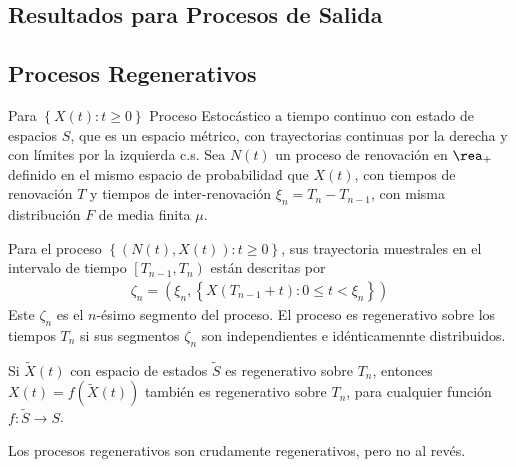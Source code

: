 \subsection{Resultados para Procesos de Salida}




\subsection{Procesos Regenerativos}

Para $\left\{X\left(t\right):t\geq0\right\}$ Proceso Estoc\'astico a tiempo continuo con estado de espacios $S$, que es un espacio m\'etrico, con trayectorias continuas por la derecha y con l\'imites por la izquierda c.s. Sea $N\left(t\right)$ un proceso de renovaci\'on en $\rea_{+}$ definido en el mismo espacio de probabilidad que $X\left(t\right)$, con tiempos de renovaci\'on $T$ y tiempos de inter-renovaci\'on $\xi_{n}=T_{n}-T_{n-1}$, con misma distribuci\'on $F$ de media finita $\mu$.



\begin{Def}
Para el proceso $\left\{\left(N\left(t\right),X\left(t\right)\right):t\geq0\right\}$, sus trayectoria muestrales en el intervalo de tiempo $\left[T_{n-1},T_{n}\right)$ est\'an descritas por
\begin{eqnarray*}
\zeta_{n}=\left(\xi_{n},\left\{X\left(T_{n-1}+t\right):0\leq t<\xi_{n}\right\}\right)
\end{eqnarray*}
Este $\zeta_{n}$ es el $n$-\'esimo segmento del proceso. El proceso es regenerativo sobre los tiempos $T_{n}$ si sus segmentos $\zeta_{n}$ son independientes e id\'enticamennte distribuidos.
\end{Def}


\begin{Obs}
Si $\tilde{X}\left(t\right)$ con espacio de estados $\tilde{S}$ es regenerativo sobre $T_{n}$, entonces $X\left(t\right)=f\left(\tilde{X}\left(t\right)\right)$ tambi\'en es regenerativo sobre $T_{n}$, para cualquier funci\'on $f:\tilde{S}\rightarrow S$.
\end{Obs}

\begin{Obs}
Los procesos regenerativos son crudamente regenerativos, pero no al rev\'es.
\end{Obs}

